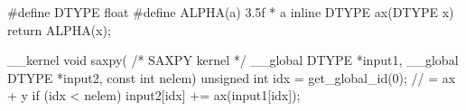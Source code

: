 #define DTYPE float
#define ALPHA(a) 3.5f * a
inline DTYPE ax(DTYPE x) { return ALPHA(x); }

__kernel void saxpy( /* SAXPY kernel */
    __global DTYPE *input1,
    __global DTYPE *input2,
    const int nelem)
{
    unsigned int idx = get_global_id(0);
    // = ax + y
    if (idx < nelem) {
        input2[idx] += ax(input1[idx]); }}
